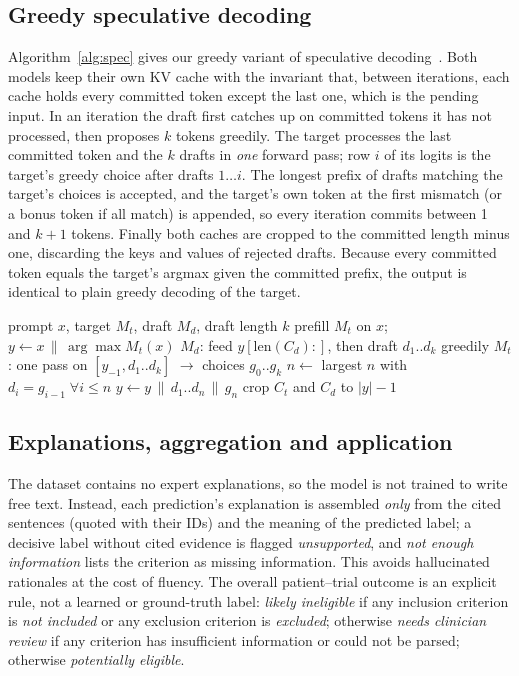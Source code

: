 \subsection{Greedy speculative decoding}
\label{sec:spec}
Algorithm~\ref{alg:spec} gives our greedy variant of speculative decoding~\cite{leviathan2023fast,chen2023accelerating}.
Both models keep their own KV cache with the invariant that, between iterations, each cache holds
every committed token except the last one, which is the pending input. In an iteration the draft first
catches up on committed tokens it has not processed, then proposes $k$ tokens greedily. The target
processes the last committed token and the $k$ drafts in \emph{one} forward pass; row $i$ of its
logits is the target's greedy choice after drafts $1\ldots i$. The longest prefix of drafts matching
the target's choices is accepted, and the target's own token at the first mismatch (or a bonus token
if all match) is appended, so every iteration commits between 1 and $k{+}1$ tokens. Finally both
caches are cropped to the committed length minus one, discarding the keys and values of rejected
drafts. Because every committed token equals the target's argmax given the committed prefix, the
output is identical to plain greedy decoding of the target.

\begin{algorithm}[t]
\caption{Greedy speculative decoding}
\label{alg:spec}
\begin{algorithmic}[1]
\Require prompt $x$, target $M_t$, draft $M_d$, draft length $k$
\State prefill $M_t$ on $x$; $y \gets x \,\|\, \arg\max M_t(x)$
  \State $M_d$: feed $y[\text{len}(C_d):]$, then draft $d_1..d_k$ greedily
  \State $M_t$: one pass on $[y_{-1}, d_1..d_k]$ $\rightarrow$ choices $g_0..g_k$
  \State $n \gets$ largest $n$ with $d_i = g_{i-1}\;\forall i\le n$
  \State $y \gets y \,\|\, d_1..d_n \,\|\, g_n$ 
  \State crop $C_t$ and $C_d$ to $|y| - 1$
\EndWhile
\end{algorithmic}
\end{algorithm}

\subsection{Explanations, aggregation and application}
\label{sec:app}
The dataset contains no expert explanations, so the model is not trained to write free text.
Instead, each prediction's explanation is assembled \emph{only} from the cited sentences (quoted with
their IDs) and the meaning of the predicted label; a decisive label without cited evidence is flagged
\emph{unsupported}, and \emph{not enough information} lists the criterion as missing information.
This avoids hallucinated rationales at the cost of fluency. The overall patient--trial outcome is
an explicit rule, not a learned or ground-truth label: \emph{likely ineligible} if any inclusion
criterion is \emph{not included} or any exclusion criterion is \emph{excluded}; otherwise \emph{needs
clinician review} if any criterion has insufficient information or could not be parsed; otherwise
\emph{potentially eligible}.

